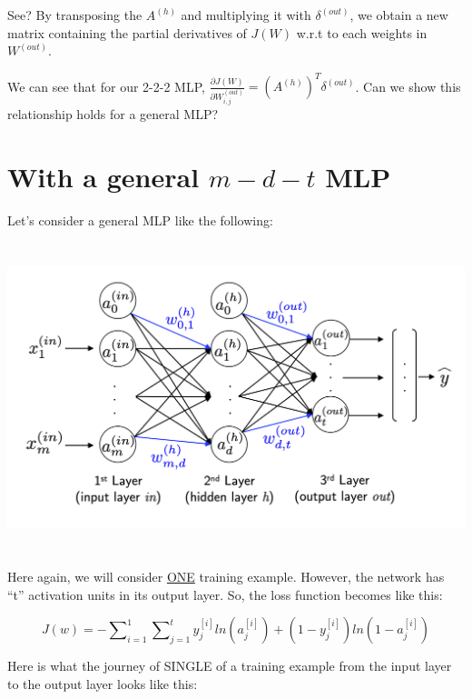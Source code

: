 \documentclass[12pt, letterpaper]{article}
\begin{document}
See? By transposing the $A^{(h)}$ and multiplying it with
$\delta^{(out)}$, we obtain a new matrix containing the partial
derivatives of $J(W)$ w.r.t to each weights in $W^{(out)}$.

\vspace{5mm} %

We can see that for our 2-2-2 MLP, $\frac{\partial J(W)}
{\partial W_{i,j}^{(out)}} = (A^{(h)})^{T} \delta^{(out)}$.
Can we show this relationship holds for a general MLP?

\pagebreak
\section{With a general $m-d-t$ MLP}

Let's consider a general MLP like the following:

\begin{center}
    \includegraphics[width = 16cm, height = 9cm]{mlp.png}
\end{center}

Here again, we will consider \underline{ONE} training example.
However, the network has ``t'' activation units in its output
layer. So, the loss function becomes like this:

\[J(w) = -\sum\nolimits_{i = 1}^{1}\sum\nolimits_{j=1}^{t} y_j^{[i]} ln(a_j^{[i]}) + (1 - y_j^{[i]})ln(1 - a_j^{[i]})\]

\vspace{5mm} %

Here is what the journey of SINGLE of a training example from 
the input layer to the output layer looks like this:
\end{document}
